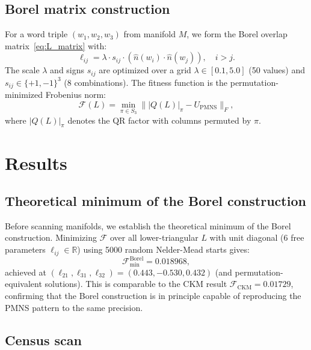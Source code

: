 \documentclass[11pt,a4paper]{article}
\begin{document}
\subsection{Borel matrix construction}

For a word triple $(w_1, w_2, w_3)$ from manifold $M$, we form the
Borel overlap matrix~\eqref{eq:L_matrix} with:
\begin{equation}
  \ell_{ij} = \lambda \cdot s_{ij} \cdot (\hat{n}(w_i) \cdot \hat{n}(w_j)),
  \quad i > j.
\end{equation}
The scale $\lambda$ and signs $s_{ij}$ are optimized over a grid
$\lambda \in [0.1, 5.0]$ (50 values) and $s_{ij} \in \{+1,-1\}^3$ (8 combinations).
The fitness function is the permutation-minimized Frobenius norm:
\begin{equation}
\label{eq:fitness}
\mathcal{F}(L) = \min_{\pi \in S_3} \||Q(L)|_\pi - U_{\mathrm{PMNS}}\|_F,
\end{equation}
where $|Q(L)|_\pi$ denotes the QR factor with columns permuted by $\pi$.

\section{Results}
\label{sec:results}

\subsection{Theoretical minimum of the Borel construction}

Before scanning manifolds, we establish the theoretical minimum of the
Borel construction. Minimizing $\mathcal{F}$ over all lower-triangular
$L$ with unit diagonal (6 free parameters $\ell_{ij} \in \mathbb{R}$)
using 5000 random Nelder-Mead starts gives:
\begin{equation}
  \mathcal{F}_\mathrm{min}^\mathrm{Borel} = 0.018968,
\end{equation}
achieved at $(\ell_{21}, \ell_{31}, \ell_{32}) = (0.443, -0.530, 0.432)$
(and permutation-equivalent solutions).
This is comparable to the CKM result $\mathcal{F}_\mathrm{CKM} = 0.01729$,
confirming that the Borel construction is in principle capable of
reproducing the PMNS pattern to the same precision.

\subsection{Census scan}
\end{document}
